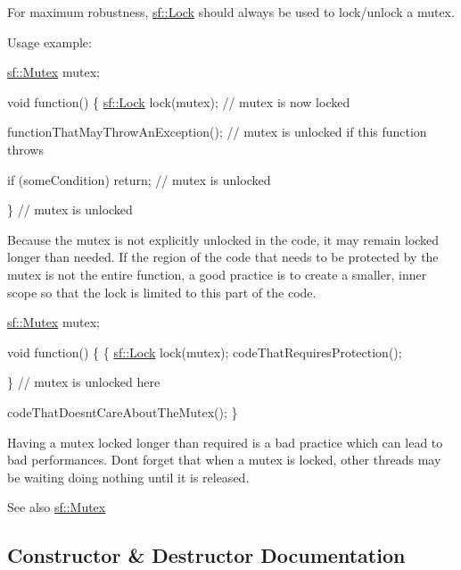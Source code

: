 For maximum robustness, \hyperlink{classsf_1_1_lock}{sf\+::\+Lock} should always be used to lock/unlock a mutex.

Usage example\+: 
\begin{DoxyCode}
\hyperlink{classsf_1_1_mutex}{sf::Mutex} mutex;

\textcolor{keywordtype}{void} \textcolor{keyword}{function}()
\{
    \hyperlink{classsf_1_1_lock}{sf::Lock} lock(mutex); \textcolor{comment}{// mutex is now locked}

    functionThatMayThrowAnException(); \textcolor{comment}{// mutex is unlocked if this function throws}

    \textcolor{keywordflow}{if} (someCondition)
        \textcolor{keywordflow}{return}; \textcolor{comment}{// mutex is unlocked}

\} \textcolor{comment}{// mutex is unlocked}
\end{DoxyCode}


Because the mutex is not explicitly unlocked in the code, it may remain locked longer than needed. If the region of the code that needs to be protected by the mutex is not the entire function, a good practice is to create a smaller, inner scope so that the lock is limited to this part of the code.


\begin{DoxyCode}
\hyperlink{classsf_1_1_mutex}{sf::Mutex} mutex;

\textcolor{keywordtype}{void} \textcolor{keyword}{function}()
\{
    \{
      \hyperlink{classsf_1_1_lock}{sf::Lock} lock(mutex);
      codeThatRequiresProtection();

    \} \textcolor{comment}{// mutex is unlocked here}

    codeThatDoesntCareAboutTheMutex();
\}
\end{DoxyCode}


Having a mutex locked longer than required is a bad practice which can lead to bad performances. Don\textquotesingle{}t forget that when a mutex is locked, other threads may be waiting doing nothing until it is released.

\begin{DoxySeeAlso}{See also}
\hyperlink{classsf_1_1_mutex}{sf\+::\+Mutex} 
\end{DoxySeeAlso}


\subsection{Constructor \& Destructor Documentation}
\mbox{\label{classsf_1_1_lock_a1a4c5d7a15da61103d85c9aa7f118920}} 
